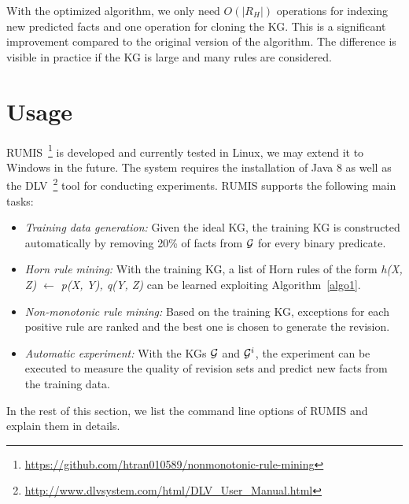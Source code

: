 With the optimized algorithm, we only need $O(|R_H|)$ operations for indexing new predicted facts and one operation for cloning the KG. This is a significant improvement compared to the original version of the algorithm. The difference is visible in practice if the KG is large and many rules are considered.

\section{Usage}

RUMIS~\footnote{\url{https://github.com/htran010589/nonmonotonic-rule-mining}} is developed and currently tested in Linux, we may extend it to Windows in the future. The system requires the installation of Java 8 as well as the DLV~\footnote{\url{http://www.dlvsystem.com/html/DLV_User_Manual.html}} tool for conducting experiments. RUMIS supports the following main tasks:

\begin{itemize}
\item \textit{Training data generation:} Given the ideal KG, the training KG is constructed automatically by removing 20\% of facts from $\mathcal{G}$ for every binary predicate.
\item \textit{Horn rule mining:} With the training KG, a list of Horn rules of the form \textit{h(X, Z) $\leftarrow$ p(X, Y), q(Y, Z)} can be learned exploiting Algorithm~\ref{algo1}.
\item \textit{Non-monotonic rule mining:} Based on the training KG, exceptions for each positive rule are ranked and the best one is chosen to generate the revision.
\item \textit{Automatic experiment:} With the KGs $\mathcal{G}$ and $\mathcal{G}^i$, the experiment can be executed to measure the quality of revision sets and predict new facts from the training data.
\end{itemize}

In the rest of this section, we list the command line options of RUMIS and explain them in details.

